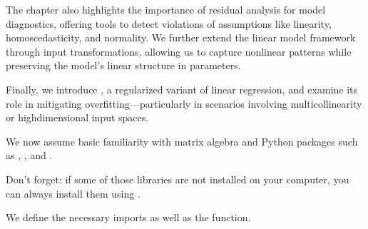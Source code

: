 \documentclass[letterpaper,10pt,english]{jupyterBook}
\begin{document}
\sphinxAtStartPar
The chapter also highlights the importance of residual analysis for model diagnostics, offering tools to detect violations of assumptions like linearity, homoscedasticity, and normality. We further extend the linear model framework through input transformations, allowing us to capture non\sphinxhyphen{}linear patterns while preserving the model’s linear structure in parameters.

\sphinxAtStartPar
Finally, we introduce , a regularized variant of linear regression, and examine its role in mitigating overfitting—particularly in scenarios involving multicollinearity or high\sphinxhyphen{}dimensional input spaces.

\sphinxAtStartPar
We now assume basic familiarity with matrix algebra and Python packages such as , , and .

\begin{sphinxShadowBox}
\sphinxstylesidebartitle{}

\sphinxAtStartPar
Don’t forget: if some of those libraries are not installed on your computer, you can always install them using .
\end{sphinxShadowBox}

\sphinxAtStartPar
We define the necessary imports as well as the  function.
\end{document}
